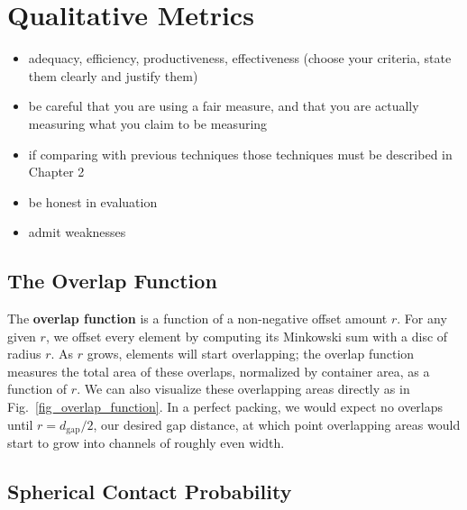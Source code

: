 
\chapter{Qualitative Metrics}

\mynote
{
\begin{itemize}
\item adequacy, efficiency, productiveness, effectiveness (choose your criteria, state them clearly and justify them)
\item be careful that you are using a fair measure, and that you are actually measuring what you claim to be measuring
\item if comparing with previous techniques those techniques must be described in Chapter 2
\item be honest in evaluation
\item admit weaknesses
\end{itemize}
}


\section{The Overlap Function}

The \textbf{overlap function} is a function of a non-negative offset amount
$r$.  For any given $r$, we offset every element by computing its Minkowski
sum with a disc of radius $r$.  As $r$ grows, elements will start overlapping;
the overlap function measures the total area of these overlaps, normalized
by container area, as a function of $r$.  We can also visualize these 
overlapping areas directly as in Fig.~\ref{fig_overlap_function}.  In a 
perfect packing, we would expect no overlaps until $r=d_\mathrm{gap}/2$,
our desired gap distance, at which point overlapping areas would start to
grow into channels of roughly even width.

\section{Spherical Contact Probability}

